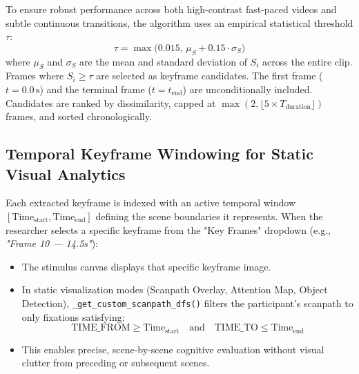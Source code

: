 \documentclass[11pt,a4paper]{article}
\begin{document}
To ensure robust performance across both high-contrast fast-paced videos and subtle continuous transitions, the algorithm uses an empirical statistical threshold $\tau$:
\begin{equation}
    \tau = \max\Big(0.015, \, \mu_S + 0.15 \cdot \sigma_S\Big)
\end{equation}
where $\mu_S$ and $\sigma_S$ are the mean and standard deviation of $S_i$ across the entire clip. Frames where $S_i \ge \tau$ are selected as keyframe candidates. The first frame ($t = 0.0\,\text{s}$) and the terminal frame ($t = t_{\text{end}}$) are unconditionally included. Candidates are ranked by dissimilarity, capped at $\max(2, \lfloor 5 \times T_{\text{duration}}\rfloor)$ frames, and sorted chronologically.

\subsection{Temporal Keyframe Windowing for Static Visual Analytics}
Each extracted keyframe is indexed with an active temporal window $[\text{Time}_{\text{start}}, \text{Time}_{\text{end}}]$ defining the scene boundaries it represents. When the researcher selects a specific keyframe from the "Key Frames" dropdown (e.g., \textit{"Frame 10 --- 14.5s"}):
\begin{itemize}[noitemsep,topsep=2pt]
    \item The stimulus canvas displays that specific keyframe image.
    \item In static visualization modes (Scanpath Overlay, Attention Map, Object Detection), \texttt{\_get\_custom\_scanpath\_dfs()} filters the participant's scanpath to only fixations satisfying:
    \begin{equation}
        \text{TIME\_FROM} \ge \text{Time}_{\text{start}} \quad \text{and} \quad \text{TIME\_TO} \le \text{Time}_{\text{end}}
    \end{equation}
    \item This enables precise, scene-by-scene cognitive evaluation without visual clutter from preceding or subsequent scenes.
\end{itemize}
\end{document}
